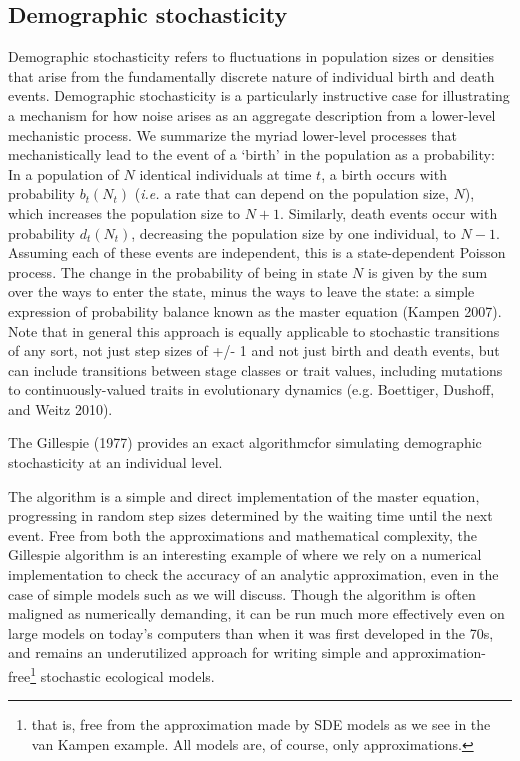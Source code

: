 \documentclass[3p]{elsarticle} %
\begin{document}
\hypertarget{demographic-stochasticity}{%
\subsection{Demographic stochasticity}\label{demographic-stochasticity}}

Demographic stochasticity refers to fluctuations in population sizes or
densities that arise from the fundamentally discrete nature of
individual birth and death events. Demographic stochasticity is a
particularly instructive case for illustrating a mechanism for how noise
arises as an aggregate description from a lower-level mechanistic
process. We summarize the myriad lower-level processes that
mechanistically lead to the event of a `birth' in the population as a
probability: In a population of \(N\) identical individuals at time
\(t\), a birth occurs with probability \(b_t(N_t)\) (\emph{i.e.} a rate
that can depend on the population size, \(N\)), which increases the
population size to \(N+1\). Similarly, death events occur with
probability \(d_t(N_t)\), decreasing the population size by one
individual, to \(N-1\). Assuming each of these events are independent,
this is a state-dependent Poisson process. The change in the probability
of being in state \(N\) is given by the sum over the ways to enter the
state, minus the ways to leave the state: a simple expression of
probability balance known as the master equation (Kampen 2007). Note
that in general this approach is equally applicable to stochastic
transitions of any sort, not just step sizes of +/- 1 and not just birth
and death events, but can include transitions between stage classes or
trait values, including mutations to continuously-valued traits in
evolutionary dynamics (e.g. Boettiger, Dushoff, and Weitz 2010).

The Gillespie (1977) provides an exact algorithmcfor simulating
demographic stochasticity at an individual level.

The algorithm is a simple and direct implementation of the master
equation, progressing in random step sizes determined by the waiting
time until the next event. Free from both the approximations and
mathematical complexity, the Gillespie algorithm is an interesting
example of where we rely on a numerical implementation to check the
accuracy of an analytic approximation, even in the case of simple models
such as we will discuss. Though the algorithm is often maligned as
numerically demanding, it can be run much more effectively even on large
models on today's computers than when it was first developed in the 70s,
and remains an underutilized approach for writing simple and
approximation-free\footnote{that is, free from the approximation made by
  SDE models as we see in the van Kampen example. All models are, of
  course, only approximations.} stochastic ecological models.
\end{document}
